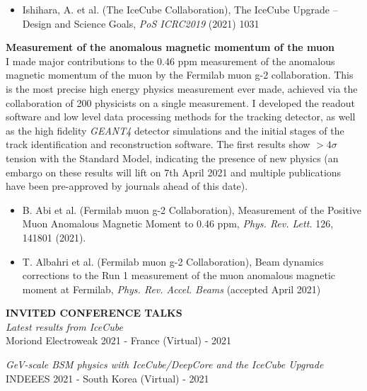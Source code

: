 \documentclass[a4paper,11pt]{article}
\newcounter{bar}
\renewcommand{\smallskip} {\vspace{0.1in}}
\begin{document}
\begin{itemize}
    \item Ishihara, A. et al. (The IceCube Collaboration), The IceCube Upgrade -- Design and Science Goals, \textit{PoS ICRC2019} (2021) 1031
\end{itemize}

\vspace{0.2cm}

{\bf Measurement of the anomalous magnetic momentum of the muon} \\ 
I made major contributions to the 0.46 ppm measurement of the anomalous magnetic momentum of the muon by the Fermilab muon g-2 collaboration. This is the most precise high energy physics measurement ever made, achieved via the collaboration of 200 physicists on a single measurement. I developed the readout software and low level data processing methods for the tracking detector, as well as the high fidelity \textit{GEANT4} detector simulations and the initial stages of the track identification and reconstruction software. The first results show $>4 \sigma$ tension with the Standard Model, indicating the presence of new physics (an embargo on these results will lift on 7th April 2021 and multiple publications have been pre-approved by journals ahead of this date).

\begin{itemize}
    \item B. Abi et al. (Fermilab muon g-2 Collaboration), Measurement of the Positive Muon Anomalous Magnetic Moment to 0.46 ppm,  \textit{Phys. Rev. Lett.} 126, 141801 (2021).  
    \item T. Albahri et al. (Fermilab muon g-2 Collaboration), Beam dynamics corrections to the Run 1 measurement of the muon anomalous magnetic moment at Fermilab, \textit{Phys. Rev. Accel. Beams} (accepted April 2021)
\end{itemize}

\vspace{0.5cm}

\textbf{INVITED CONFERENCE TALKS ~~\hrulefill}\smallskip\\
%
{\it Latest results from IceCube} \\ 
 Moriond Electroweak 2021 - France (Virtual) - 2021
 
 {\it GeV-scale BSM physics with IceCube/DeepCore and the IceCube Upgrade} \\ 
 INDEEES 2021 - South Korea (Virtual) - 2021
\end{document}
